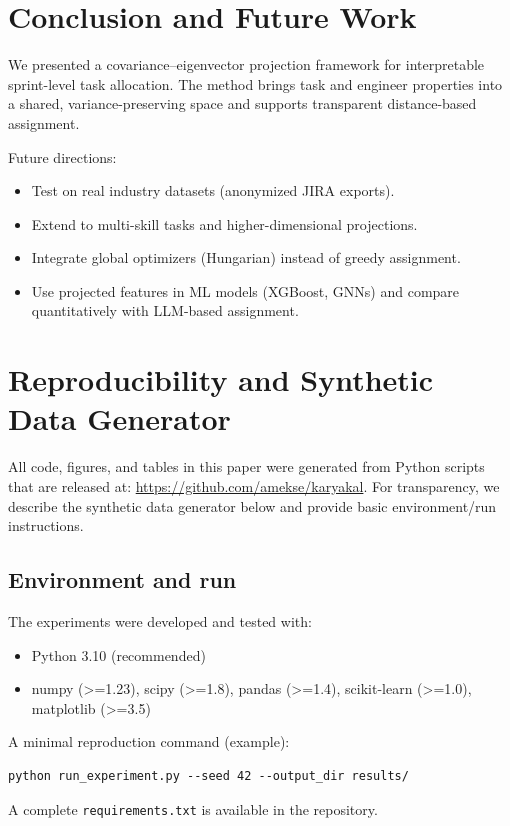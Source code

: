 \documentclass[final,1p,times]{elsarticle}
\begin{document}
\section{Conclusion and Future Work}\label{sec:concl}
We presented a covariance--eigenvector projection framework for interpretable sprint-level task allocation. The method brings task and engineer properties into a shared, variance-preserving space and supports transparent distance-based assignment.

Future directions:
\begin{itemize}[leftmargin=*]
    \item Test on real industry datasets (anonymized JIRA exports).
    \item Extend to multi-skill tasks and higher-dimensional projections.
    \item Integrate global optimizers (Hungarian) instead of greedy assignment.
    \item Use projected features in ML models (XGBoost, GNNs) and compare quantitatively with LLM-based assignment.
\end{itemize}

\appendix
\section{Reproducibility and Synthetic Data Generator}
All code, figures, and tables in this paper were generated from Python scripts that are released at: 
\url{https://github.com/amekse/karyakal}.
For transparency, we describe the synthetic data generator below and provide basic environment/run instructions.

\subsection{Environment and run}
The experiments were developed and tested with:
\begin{itemize}[leftmargin=*]
    \item Python 3.10 (recommended)
    \item numpy (>=1.23), scipy (>=1.8), pandas (>=1.4), scikit-learn (>=1.0), matplotlib (>=3.5)
\end{itemize}

A minimal reproduction command (example):
\begin{verbatim}
python run_experiment.py --seed 42 --output_dir results/
\end{verbatim}
A complete \texttt{requirements.txt} is available in the repository.
\end{document}
